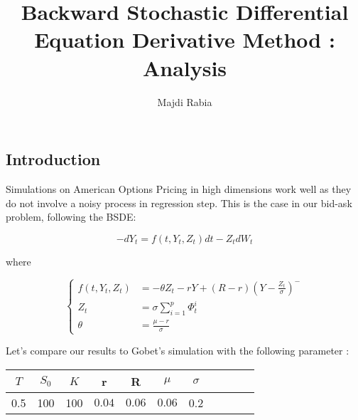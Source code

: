 \documentclass[english,11pt,openany]{article}
\theoremstyle{definition}
\begin{document}
\begin{titlepage}

\title{
\hspace{0.75cm}Backward Stochastic Differential Equation 
\newline
\hspace{0.35cm}\textbf{Derivative Method : Analysis}
}

\author{Majdi Rabia}
\date{
\hspace{2.5cm} 
\newline
}

\maketitle

\section{Introduction}


Simulations on American Options Pricing in high dimensions work well as they do not involve a noisy process in regression step. This is the case in our bid-ask problem, following the BSDE: 

\begin{equation}
-dY_t=f(t,Y_t,Z_t)dt - Z_tdW_t  
\end{equation}

where 

\[
\left\{
\begin{aligned}
f(t,Y_t,Z_t) & =  - \theta Z_t - rY + (R-r)(Y-\frac{Z_t}{\sigma})^-\\
Z_t & = \sigma \sum_{i = 1}^{p} \Phi^i_t\\
\theta &= \frac{\mu - r}{\sigma}
\end{aligned}
\right.
\]

Let's compare our results to Gobet's simulation with the following parameter : 

\begin{tabular}{c|c|c|c|c|c|c|c|c|c|c}
	$T$ & $S_0$  & $K$ & r & R & $\mu$ & $\sigma$ \\
	\hline
	0.5  & 100  & 100  & $0.04$ & $0.06 $ & $0.06$ & 0.2
\end{tabular}

\newpage


\end{titlepage}
\end{document}
